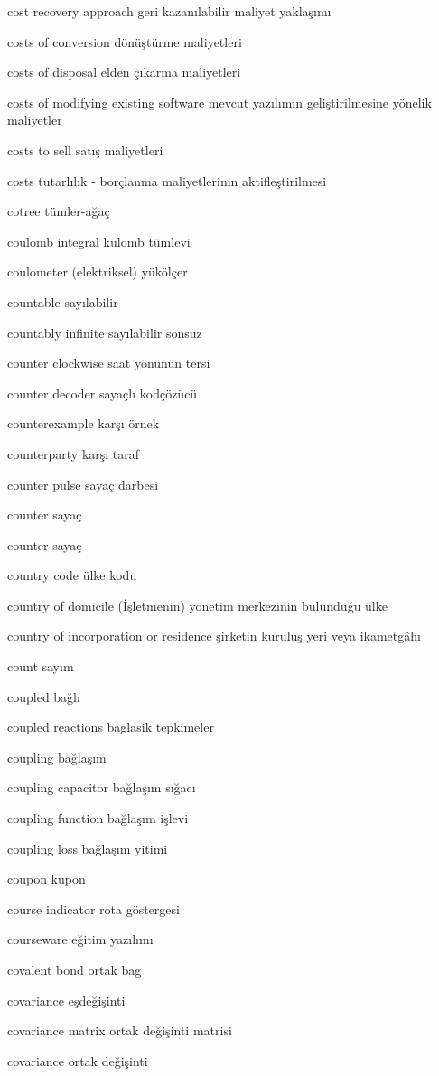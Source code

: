 \documentclass[12pt,fleqn]{article}\usepackage{../../common}
\begin{document}
cost recovery approach geri kazanılabilir maliyet yaklaşımı

costs of conversion dönüştürme maliyetleri

costs of disposal elden çıkarma maliyetleri

costs of modifying existing software mevcut yazılımın geliştirilmesine yönelik maliyetler

costs to sell satış maliyetleri

costs tutarlılık - borçlanma maliyetlerinin aktifleştirilmesi

cotree tümler-ağaç

coulomb integral kulomb tümlevi

coulometer (elektriksel) yükölçer

countable sayılabilir

countably infinite sayılabilir sonsuz

counter clockwise saat yönünün tersi

counter decoder sayaçlı kodçözücü

counterexample karşı örnek

counterparty karşı taraf

counter pulse sayaç darbesi

counter sayaç

counter sayaç

country code ülke kodu

country of domicile (İşletmenin) yönetim merkezinin bulunduğu ülke

country of incorporation or residence şirketin kuruluş yeri veya ikametgâhı

count sayım

coupled bağlı

coupled reactions baglasik tepkimeler

coupling bağlaşım

coupling capacitor bağlaşım sığacı

coupling function bağlaşım işlevi

coupling loss bağlaşım yitimi

coupon kupon

course indicator rota göstergesi

courseware eğitim yazılımı

covalent bond ortak bag

covariance eşdeğişinti

covariance matrix ortak değişinti matrisi

covariance ortak değişinti
\end{document}
